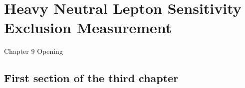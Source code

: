 \chapter{Heavy Neutral Lepton Sensitivity Exclusion Measurement}

\ifpdf
    \graphicspath{{Chapter9/Figs/Raster/}{Chapter9/Figs/PDF/}{Chapter9/Figs/}}
\else
    \graphicspath{{Chapter9/Figs/Vector/}{Chapter9/Figs/}}
\fi


Chapter 9 Opening


\section{First section of the third chapter}

